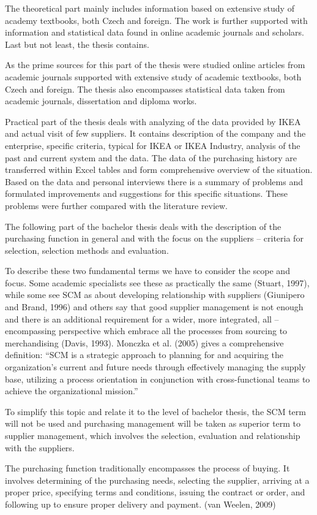 \documentclass[oneside,12pt]{article}%
\begin{document}
The theoretical part mainly includes information based on extensive study of academy textbooks, both Czech and foreign. The work is further supported with information and statistical data found in online academic journals and scholars. Last but not least, the thesis contains. \par
As the prime sources for this part of the thesis were studied online articles from academic journals supported with extensive study of academic textbooks, both Czech and foreign. The thesis also encompasses statistical data taken from academic journals, dissertation and diploma works. \par
Practical part of the thesis deals with analyzing of the data provided by IKEA and actual visit of few suppliers. It contains description of the company and the enterprise, specific criteria, typical for IKEA or IKEA Industry, analysis of the past and current system and the data. The data of the purchasing history are transferred within Excel tables and form comprehensive overview of the situation. Based on the data and personal interviews there is a summary of problems and formulated improvements and suggestions for this specific situations. These problems were further compared with the literature review.

The following part of the bachelor thesis deals with the description of the purchasing function in general and with the focus on the suppliers – criteria for selection, selection methods and evaluation.

To describe these two fundamental terms we have to consider the scope and focus. Some academic specialists see these as practically the same (Stuart, 1997), while some see SCM as about developing relationship with suppliers (Giunipero and Brand, 1996) and others say that good supplier management is not enough and there is an additional requirement for a wider, more integrated, all – encompassing perspective which embrace all the processes from sourcing to merchandising (Davis, 1993). Monczka et al. (2005) gives a comprehensive definition: “SCM is a strategic approach to planning for and acquiring the organization’s current and future needs through effectively managing the supply base, utilizing a process orientation in conjunction with cross-functional teams to achieve the organizational mission.” \par
To simplify this topic and relate it to the level of bachelor thesis, the SCM term will not be used and purchasing management will be taken as superior term to supplier management, which involves the selection, evaluation and relationship with the suppliers.\par
The purchasing function traditionally encompasses the process of buying. It involves determining of the purchasing needs, selecting the supplier, arriving at a proper price, specifying terms and conditions, issuing the contract or order, and following up to ensure proper delivery and payment. (van Weelen, 2009)
\end{document}
